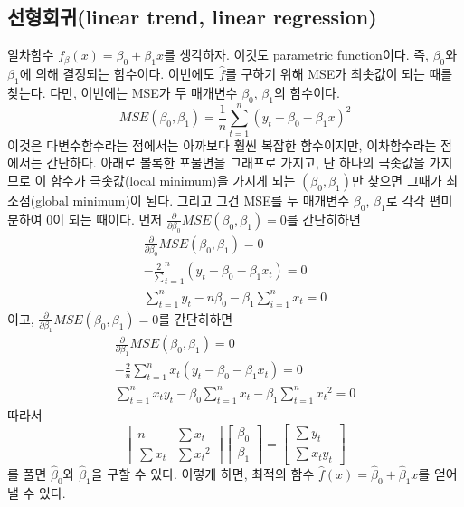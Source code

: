 \documentclass{article}
\begin{document}
\subsection{선형회귀(linear trend, linear regression)}
일차함수 \(f_\beta(x)=\beta_0+\beta_1x\)를 생각하자.\footnotemark
{}
이것도 parametric function이다.
즉, \(\beta_0\)와 \(\beta_1\)에 의해 결정되는 함수이다.
이번에도 \(\hat f\)를 구하기 위해 MSE가 최솟값이 되는 때를 찾는다.
다만, 이번에는 MSE가 두 매개변수 \(\beta_0\), \(\beta_1\)의 함수이다.
\[MSE(\beta_0,\beta_1)=\frac1n\sum_{t=1}^n(y_t-\beta_0-\beta_1x)^2\]
이것은 다변수함수라는 점에서는 아까보다 훨씬 복잡한 함수이지만, 이차함수라는 점에서는 간단하다.
아래로 볼록한 포물면을 그래프로 가지고, 단 하나의 극솟값을 가지므로 이 함수가 극솟값(local minimum)을 가지게 되는 \((\beta_0, \beta_1)\)만 찾으면 그때가 최소점(global minimum)이 된다.
그리고 그건 MSE를 두 매개변수 \(\beta_0\), \(\beta_1\)로 각각 편미분하여 0이 되는 때이다.
먼저 \(\frac{\partial}{\partial\beta_0}MSE(\beta_0,\beta_1)=0\)를 간단히하면
\begin{gather*}
\frac{\partial}{\partial\beta_0}MSE(\beta_0,\beta_1)=0\\
-\frac2\sum_{t=1}^n(y_t-\beta_0-\beta_1x_t)=0\\
\sum_{t=1}^ny_t-n\beta_0-\beta_1\sum_{i=1}^nx_t=0
\end{gather*}
이고, \(\frac{\partial}{\partial\beta_1}MSE(\beta_0,\beta_1)=0\)를 간단히하면
\begin{gather*}
\frac{\partial}{\partial\beta_1}MSE(\beta_0,\beta_1)=0\\
-\frac2n\sum_{t=1}^nx_t(y_t-\beta_0-\beta_1x_t)=0\\
\sum_{t=1}^nx_ty_t-\beta_0\sum_{t=1}^nx_t-\beta_1\sum_{t=1}^n{x_t}^2=0
\end{gather*}
따라서
\[
\begin{bmatrix}
n&\sum x_t\\
\sum x_t&\sum{x_t}^2
\end{bmatrix}
\begin{bmatrix}
\beta_0\\\beta_1
\end{bmatrix}
=
\begin{bmatrix}
\sum y_t\\\sum x_ty_t
\end{bmatrix}
\]
를 풀면 \(\hat\beta_0\)와 \(\hat\beta_1\)을 구할 수 있다.
이렇게 하면, 최적의 함수 \(\hat f(x)=\hat\beta_0+\hat\beta_1x\)를 얻어낼 수 있다.
\end{document}

